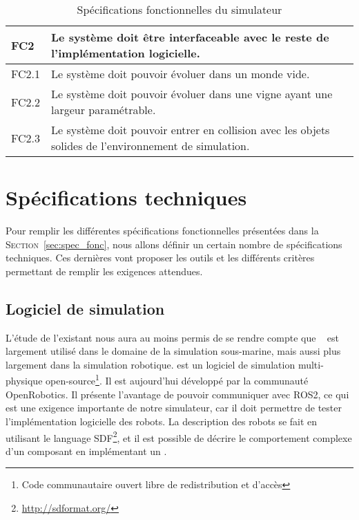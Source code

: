 \begin{table}[!htb]
\begin{adjustbox}{max width=\textwidth}
\begin{tabularx}{\textwidth}{|lX|}
                    \hline \hline
            
                    \cellcolor{orange!40}\textbf{FC2}&\cellcolor{orange!30} Le système doit être interfaceable avec le reste de l'implémentation logicielle. \\
                    \hline
                    \cellcolor{gray!10}FC2.1& Le système doit pouvoir évoluer dans un monde vide. \\
                    \hline
                    \cellcolor{gray!10}FC2.2& Le système doit pouvoir évoluer dans une vigne ayant une largeur paramétrable. \\
                    \hline
                    \cellcolor{gray!10}FC2.3& Le système doit pouvoir entrer en collision avec les objets solides de l'environnement de simulation. \\
                    \hline
                \end{tabularx}
            \end{adjustbox}
            \caption{Spécifications fonctionnelles du simulateur}
            \label{table:specs}
        \end{table}    

    \section{Spécifications techniques}

        Pour remplir les différentes spécifications fonctionnelles présentées dans la \textsc{Section}~\ref{sec:spec_fonc}, nous allons définir un certain nombre de spécifications techniques. Ces dernières vont proposer les outils et les différents critères permettant de remplir les exigences attendues.

        \subsection{Logiciel de simulation}

            L'étude de l'existant nous aura au moins permis de se rendre compte que \gazebo{}~\cite{Koenig-gazebo} est largement utilisé dans le domaine de la simulation sous-marine, mais aussi plus largement dans la simulation robotique. \gazebo{} est un logiciel de simulation multi-physique open-source\footnote{Code communautaire ouvert libre de redistribution et d'accès}. Il est aujourd'hui développé par la communauté \gls{OpenRobotics}. Il présente l'avantage de pouvoir communiquer avec \gls{ROS2}, ce qui est une exigence importante de notre simulateur, car il doit permettre de tester l'implémentation logicielle des robots. La description des robots se fait en utilisant le language \gls{SDF}\footnote{\url{http://sdformat.org/}}, et il est possible de décrire le comportement complexe d'un composant en implémentant un \plugin{}.

